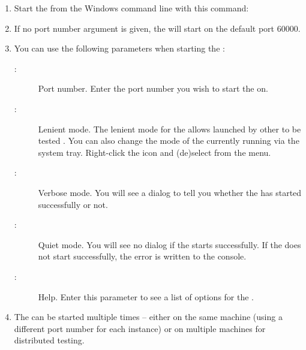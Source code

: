 \begin{enumerate}
\item Start the \gdagent{} from the Windows command line with this command:\\

\item If no port number argument is given, the \gdagent{}  will start on the default port 60000. 

\item You can use the following parameters when starting the \gdagent{}:

\begin{description}
\item [:]{Port number. Enter the port number you wish to start the \gdagent{} on. }
\item[:]{Lenient mode. The lenient mode for the \gdagent{} allows \gdauts{} launched  by other \gdauts{} to be tested . You can also change the mode of the currently running \gdagent{} via the system tray. Right-click the \gdagent{} icon and (de)select  from the menu.}
\item [:]{Verbose mode. You will see a dialog to tell you whether the \gdagent{} has started successfully or not.}
\item [:]{Quiet mode. You will see no dialog if the \gdagent{} starts successfully. If the \gdagent{} does not start successfully, the error is written to the console.}
\item [:]{Help. Enter this parameter to see a list of options for the \gdagent{}.}
\end{description}

\item The \gdagent{} can be started multiple times -- either on the same machine (using a different port number for each instance) or on multiple machines for distributed testing. 

\end{enumerate}


